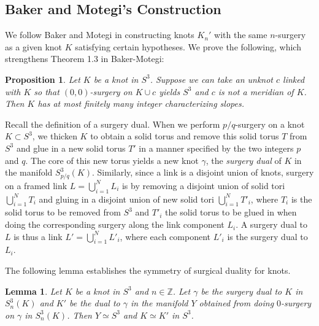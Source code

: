\documentclass[11pt,usenames,dvipsnames,reqno]{amsart}
\numberwithin{theorem}{section}
\newtheorem{lemma}[theorem]{Lemma}
\newtheorem{proposition}[theorem]{Proposition}
\theoremstyle{ex}
\theoremstyle{rem}
\begin{document}
\subsection{Baker and Motegi's Construction} We follow Baker and Motegi \cite{baker-motegi} in constructing knots $K_n'$ with the same $n$-surgery as a given knot $K$ satisfying certain hypotheses. We prove the following, which strengthens Theorem 1.3 in Baker-Motegi:

\begin{proposition}\label{prop 2.3}
	Let $K$ be a knot in $S^3$. Suppose we can take an unknot $c$ linked with $K$ so that $(0,0)$-surgery on $K\cup c$ yields $S^3$ and $c$ is not a meridian of $K$. Then $K$ has at most finitely many integer characterizing slopes.
\end{proposition}

Recall the definition of a surgery dual. When we perform $p/q$-surgery on a knot $K\subset S^3$, we thicken $K$ to obtain a solid torus and remove this solid torus $T$ from $S^3$ and glue in a new solid torus $T'$ in a manner specified by the two integers $p$ and $q$. The core of this new torus yields a new knot $\gamma$, the \textit{surgery dual} of $K$ in the manifold $S^3_{p/q}(K)$. Similarly, since a link is a disjoint union of knots, surgery on a framed link $L =\bigcup^{N}_{i=1} L_i$ is by removing a disjoint union of solid tori $\bigcup^{N}_{i=1} T_i$ and gluing in a disjoint union of new solid tori $\bigcup^{N}_{i=1} T'_i$, where $T_i$ is the solid torus to be removed from $S^3$ and $T'_i$ the solid torus to be glued in when doing the corresponding surgery along the link component $L_i$. A surgery dual to $L$ is thus a link $L' = \bigcup^{N}_{i=1} L'_i$, where each component $L'_i$ is the surgery dual to $L_i$.

The following lemma establishes the symmetry of surgical duality for knots.

\begin{lemma}
	Let $K$ be a knot in $S^3$ and $n\in\mathbb{Z}$. Let $\gamma$ be the surgery dual to $K$ in $S^3_n(K)$ and $K'$ be the dual to $\gamma$ in the manifold $Y$ obtained from doing $0$-surgery on $\gamma$ in $S^3_n(K)$. Then $Y\simeq S^3$ and $K\simeq K'$ in $S^3$.
\end{lemma}
\end{document}
